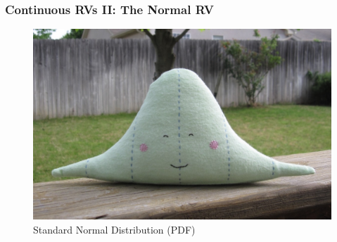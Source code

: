 \documentclass[handout]{beamer}
\date{Lecture \# 12}
\begin{document}
 


\begin{frame}[plain]
	\titlepage 
	

\end{frame} 

\begin{frame}
  \frametitle{Continuous RVs II: The Normal RV}
\begin{figure}
\includegraphics[scale = 0.2]{./images/normal_etsy1}
\caption{Standard Normal Distribution (PDF)}
\end{figure}
\end{frame}
\end{document}
